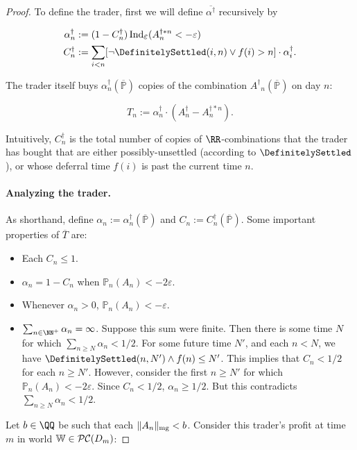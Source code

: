 \documentclass[authordate,onecolumn,noenvironments]{miri-tech-article}
\numberwithin{equation}{subsection}
\newcommand{\seq}[1]{{\overline{#1}}}
\newcommand{\mm}{m}
\newcommand{\nn}{n}
\newcommand{\deff}{f}
\newcommand{\aff}{A}
\newcommand{\gens}{\dagger}
\newcommand{\gen}[1]{{#1^\gens}}
\newcommand{\magnit}[1]{{\|#1\|_{\rm mg}}} %
\newcommand{\BelState}{\mathbb{P}}
\newcommand{\pt}{\BelState}
\newcommand{\MP}{\seq{\pt}}
\newcommand{\ftn}{(\MP)} %
\newcommand{\dt}{D}
\newcommand{\pcworlds}{\mathcal{P\-C}}
\newcommand{\World}{\mathbb{W}}
\newcommand{\ctsind}[1]{\operatorname{Ind}_{\text{\small{${#1}$}}}} %
\begin{document}
\begin{proof}
To define the trader, first we will define $\seq{\gen{\alpha}}$ recursively by

\begin{align*}
  \gen{\alpha_\nn} &:= (1 - \gen{C_\nn} ) \ctsind{\varepsilon}(\aff_n^{\gens * n}  < - \varepsilon)
 \\
 \gen{C_\nn} &:= \sum_{i < \nn} [\neg\DefinitelySettled(i, \nn) \vee \deff(i) > \nn] \cdot \gen{\alpha_i}.
\end{align*}

The trader itself buys $\gen{\alpha_\nn} \ftn$ copies of the combination $\gen\aff_n \ftn$ on day $n$:

\[ T_\nn := \gen{\alpha_\nn} \cdot (\gen{\aff_\nn} - \aff_n^{\dagger * n}). \]

Intuitively, $\gen{C_\nn}$ is the total number of copies of $\RR$-combinations that the trader has bought that are either possibly-unsettled (according to $\DefinitelySettled$), or whose deferral time $\deff(i)$ is past the current time $\nn$. 

\paragraph{Analyzing the trader.}
As shorthand, define $\alpha_\nn := \gen{\alpha_\nn} \ftn$ and $C_n := \gen{C_n} \ftn$.
Some important properties of $\seq T$ are:
\begin{itemize}
\item Each $C_\nn \leq 1$.
\item $\alpha_\nn = 1 - C_\nn $ when $\pt_\nn(\aff_\nn) < - 2 \varepsilon$.
\item Whenever $\alpha_\nn > 0$, $\pt_\nn(\aff_\nn) < - \varepsilon$.

\item $\sum_{\nn\in {\NN^+}} \alpha_\nn =\infty$.  
  Suppose this sum were finite.  Then there is some time $N$ for which $\sum_{\nn \geq N} \alpha_\nn < 1/2$.  
  For some future time $N'$, and each $\nn < N$, we have $\DefinitelySettled(\nn, N') \wedge \deff(\nn) \leq N'$.  
  This implies that $C_\nn < 1/2$ for each $\nn \geq N'$.  
  However, consider the first $\nn \geq N'$ for which $\pt_\nn(\aff_\nn) < - 2 \varepsilon$.  
  Since $C_\nn < 1/2$, $\alpha_n \geq 1/2$.  But this contradicts $\sum_{n \geq N} \alpha_n < 1/2$.
\end{itemize}

Let $b \in \QQ$ be such that each $\magnit{\aff_n} < b$.  Consider this trader's profit at time $m$ in world $\World\in\pcworlds(\dt_\mm)$:


\end{proof}
\end{document}
